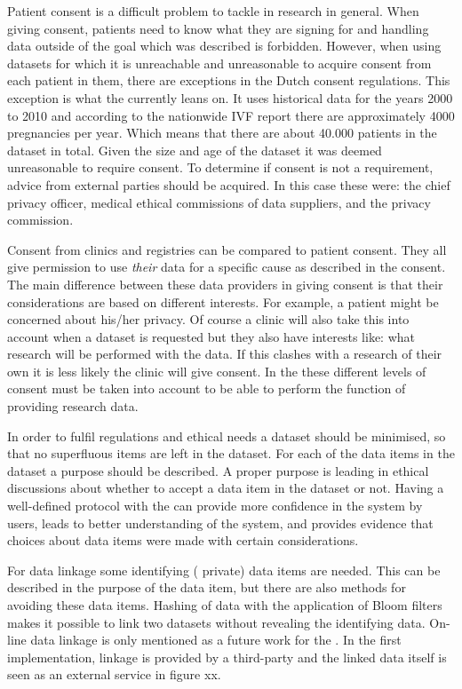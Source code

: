 Patient consent is a difficult problem to tackle in research in general.
When giving consent, patients need to know what they are signing for and handling data outside of the goal which was described is forbidden.
However, when using datasets for which it is unreachable and unreasonable to acquire consent from each patient in them, there are exceptions in the Dutch consent regulations.
This exception is what the \ivfsystem{} currently leans on. 
It uses historical data for the years 2000 to 2010 and according to the nationwide IVF report \cite{ivfReportNVOG} there are approximately 4000 pregnancies per year.
Which means that there are about 40.000 patients in the dataset in total.
Given the size and age of the dataset it was deemed unreasonable to require consent.
To determine if consent is not a requirement, advice from external parties should be acquired.
In this case these were: the \AMC{} chief privacy officer, medical ethical commissions of data suppliers, and the \PRN{} privacy commission.

Consent from clinics and registries can be compared to patient consent.
They all give permission to use \emph{their} data for a specific cause as described in the consent.
The main difference between these data providers in giving consent is that their considerations are based on different interests.
For example, a patient might be concerned about his/her privacy.
Of course a clinic will also take this into account when a dataset is requested but they also have interests like: what research will be performed with the data.
If this clashes with a research of their own it is less likely the clinic will give consent.
In the \ivfsystem{} these different levels of consent must be taken into account  to be able to perform the function of providing research data.

In order to fulfil regulations and ethical needs a dataset should be minimised, so that no superfluous items are left in the dataset.
For each of the data items in the dataset a purpose should be described. 
A proper purpose is leading in ethical discussions about whether to accept a data item in the dataset or not.
Having a well-defined protocol with the \ivfsystem{} can provide more confidence in the system by users, leads to better understanding of the system, and provides evidence that choices about data items were made with certain considerations.

For data linkage some identifying (\ie{} private) data items are needed.
This can be described in the purpose of the data item, but there are also methods for avoiding these data items.
Hashing of data with the application of Bloom filters \cite{something} makes it possible to link two datasets without revealing the identifying data.
On-line data linkage is only mentioned as a future work for the \ivfsystem{}.
In the first implementation, linkage is provided by a third-party and the linked data itself is seen as an external service in figure xx.

